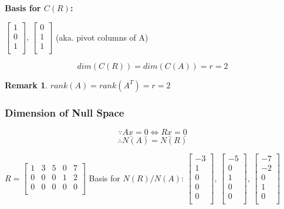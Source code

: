\documentclass[12pt,a4paper]{article}
\newtheorem*{rem}{Remark}
\newcommand{\Remark}[1]{
  \begin{rem}
    \color{cyan}
    #1
  \end{rem}
}
\begin{document}
\textbf{Basis for $C(R)$:}

$
\begin{bmatrix}
  1 \\
  0 \\
  1 \\
\end{bmatrix},\,
\begin{bmatrix}
  0 \\
  1 \\
  1 \\
\end{bmatrix}
$ (aka. pivot columns of A)

\[dim(C(R)) = dim(C(A)) =  r = 2\]

\Remark{$rank(A) = rank(A^T) = r = 2$}

\subsubsection*{Dimension of Null Space}

\[\because A\underline{x} = \underline{0} \iff R\underline{x} = \underline{0}\]
\[\therefore N(A) = N(R)\]

$
R =
\begin{bmatrix}
  \boxed{1} & 3 & 5 & 0 & 7 \\
  0 & 0 & 0 & \boxed{1} & 2 \\
  0 & 0 & 0 & 0 & 0 \\
\end{bmatrix}
$
Basis for $N(R)/N(A)$:
$
\begin{bmatrix}
  -3 \\
  1 \\
  0 \\
  0 \\
  0 \\
\end{bmatrix},\,
\begin{bmatrix}
  -5 \\
  0 \\
  1 \\
  0 \\
  0 \\
\end{bmatrix},\,
\begin{bmatrix}
  -7 \\
  -2 \\
  0 \\
  1 \\
  0 \\
\end{bmatrix}
$
\end{document}
